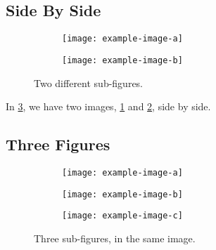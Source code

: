 \subsection{Side By Side}

\begin{figure}[!ht]
	\centering
	\begin{subfigure}[t]{.40\textwidth}
		\centering
		\texttt{[image: example-image-a]}
		\label{subfig1:left_subimage}
	\end{subfigure}
	\hspace{.10\textwidth} %
	\begin{subfigure}[t]{.40\textwidth}
		\centering
		\texttt{[image: example-image-b]}
		\label{subfig1:right_subimage}
	\end{subfigure}
	\caption{Two different sub-figures.}
	\label{fig1:two_images}
\end{figure}

In \ref{fig1:two_images}, we have two images, \ref{subfig1:left_subimage} and \ref{subfig1:right_subimage}, side by side.


\clearpage
\subsection{Three Figures}

\begin{figure}[!ht]
	\begin{subfigure}[t]{.40\textwidth}
		\centering
		\texttt{[image: example-image-a]}
		\label{subfig1:first_image}
	\end{subfigure}
	\hspace{.10\textwidth}
	\begin{subfigure}[t]{.40\textwidth}
		\centering
		\texttt{[image: example-image-b]}
		\label{subfig1:second_image}
	\end{subfigure}
	\centering
	\begin{subfigure}[t]{.40\textwidth}
		\centering
		\texttt{[image: example-image-c]}
		\label{subfig1:third_image}
	\end{subfigure}
	\caption{Three sub-figures, in the same image.}
	\label{fig1:three_images}
\end{figure}

